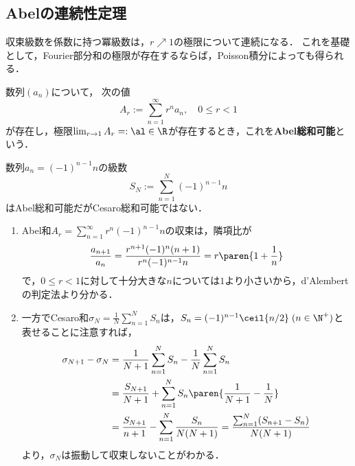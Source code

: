 \documentclass[uplatex,dvipdfmx]{jsreport}
\begin{document}
\subsection{Abelの連続性定理}

\begin{tcolorbox}[colframe=ForestGreen, colback=ForestGreen!10!white,breakable,colbacktitle=ForestGreen!40!white,coltitle=black,fonttitle=\bfseries\sffamily,
title=]
    収束級数を係数に持つ冪級数は，$r\nearrow1$の極限について連続になる．
    これを基礎として，Fourier部分和の極限が存在するならば，Poisson積分によっても得られる．
\end{tcolorbox}

\begin{definition}
    数列$(a_n)$について，
    次の値
    \[A_r:=\sum_{n=1}^\infty r^na_n,\quad 0\le r<1\]
    が存在し，極限$\lim_{r\to1}A_r=:\al\in\R$が存在するとき，これを\textbf{Abel総和可能}という．
\end{definition}

\begin{example}
    数列$a_n=(-1)^{n-1}n$の級数
    \[S_N:=\sum_{n=1}^N(-1)^{n-1}n\]
    はAbel総和可能だがCesaro総和可能ではない．
\end{example}
\begin{Proof}\mbox{}
    \begin{enumerate}
        \item Abel和$A_r=\sum_{n=1}^\infty r^n(-1)^{n-1}n$の収束は，隣項比が
        \[\frac{a_{n+1}}{a_n}=\frac{r^{n+1}(-1)^{n}(n+1)}{r^n(-1)^{n-1}n}=r\paren{1+\frac{1}{n}}\]
        で，$0\le r<1$に対して十分大きな$n$については$1$より小さいから，d'Alembertの判定法より分かる．
        \item 一方でCesaro和$\sigma_N=\frac{1}{N}\sum_{n=1}^NS_n$は，$S_n=(-1)^{n-1}\ceil{n/2}\;(n\in\N^+)$と表せることに注意すれば，
        \begin{align*}
            \sigma_{N+1}-\sigma_N&=\frac{1}{N+1}\sum_{n=1}^NS_n-\frac{1}{N}\sum_{n=1}^NS_n\\
            &=\frac{S_{N+1}}{N+1}+\sum_{n=1}^NS_n\paren{\frac{1}{N+1}-\frac{1}{N}}\\
            &=\frac{S_{N+1}}{n+1}-\sum_{n=1}^N\frac{S_n}{N(N+1)}=\frac{\sum_{n=1}^N(S_{n+1}-S_n)}{N(N+1)}
        \end{align*}
        より，$\sigma_N$は振動して収束しないことがわかる．
    \end{enumerate}
\end{Proof}
\end{document}
